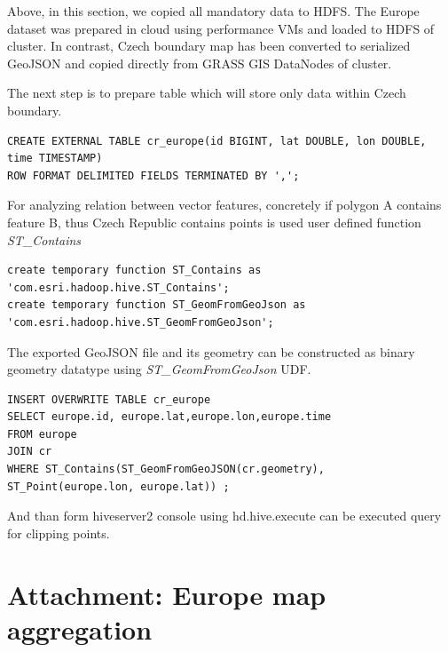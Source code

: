 \documentclass[a4paper,12pt,oneside]{report}
\begin{document}
		Above, in this section, we copied all mandatory data to HDFS. The Europe
		dataset was prepared in cloud using performance VMs
		and loaded to HDFS of cluster. In contrast, Czech boundary map has been
		converted to serialized GeoJSON and copied directly from GRASS GIS DataNodes of
		cluster.
		
		The next step is to prepare table which will store only data within Czech boundary.
	\begin{footnotesize}
		\begin{lstlisting}[style=python]
CREATE EXTERNAL TABLE cr_europe(id BIGINT, lat DOUBLE, lon DOUBLE, time TIMESTAMP)
ROW FORMAT DELIMITED FIELDS TERMINATED BY ',';
		\end{lstlisting}
	\end{footnotesize}
For  analyzing relation between vector features, concretely if polygon A contains feature B, thus Czech Republic contains points is used user defined function \textit{ST\_Contains}
	\begin{footnotesize}
		\begin{lstlisting}[style=python]
create temporary function ST_Contains as 'com.esri.hadoop.hive.ST_Contains';
create temporary function ST_GeomFromGeoJson as 'com.esri.hadoop.hive.ST_GeomFromGeoJson';
		\end{lstlisting}
	\end{footnotesize}
The exported GeoJSON file and its geometry can be constructed as binary geometry
 datatype using \textit{ST\_GeomFromGeoJson} UDF.
	\begin{footnotesize}
		\begin{lstlisting}[style=python]
INSERT OVERWRITE TABLE cr_europe
SELECT europe.id, europe.lat,europe.lon,europe.time
FROM europe 
JOIN cr 
WHERE ST_Contains(ST_GeomFromGeoJSON(cr.geometry), ST_Point(europe.lon, europe.lat)) ;
		\end{lstlisting}
	\end{footnotesize}
And than form hiveserver2 console using hd.hive.execute can be executed query for clipping points.


\newpage
	\section*{Attachment: Europe map aggregation}\label{open_street_agg_all}
	
\end{document}
